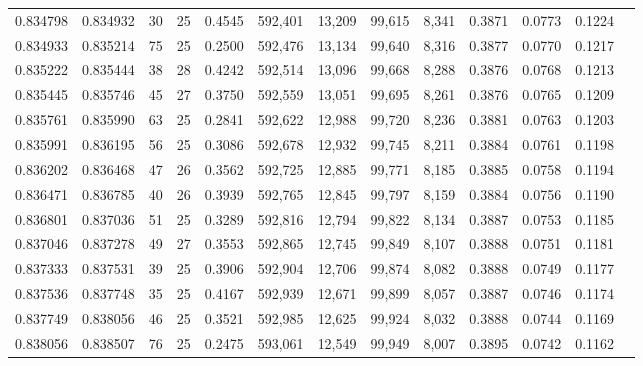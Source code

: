 \begin{tabular}{rrrrrrrrrrrrr}
0.834798 & 0.834932 &    30 &  25 &                                     0.4545 & 592,401 &  13,209 &  99,615 &   8,341 & 0.3871 & 0.0773 & 0.1224 \\
0.834933 & 0.835214 &    75 &  25 &                                     0.2500 & 592,476 &  13,134 &  99,640 &   8,316 & 0.3877 & 0.0770 & 0.1217 \\
0.835222 & 0.835444 &    38 &  28 &                                     0.4242 & 592,514 &  13,096 &  99,668 &   8,288 & 0.3876 & 0.0768 & 0.1213 \\
0.835445 & 0.835746 &    45 &  27 &                                     0.3750 & 592,559 &  13,051 &  99,695 &   8,261 & 0.3876 & 0.0765 & 0.1209 \\
0.835761 & 0.835990 &    63 &  25 &                                     0.2841 & 592,622 &  12,988 &  99,720 &   8,236 & 0.3881 & 0.0763 & 0.1203 \\
0.835991 & 0.836195 &    56 &  25 &                                     0.3086 & 592,678 &  12,932 &  99,745 &   8,211 & 0.3884 & 0.0761 & 0.1198 \\
0.836202 & 0.836468 &    47 &  26 &                                     0.3562 & 592,725 &  12,885 &  99,771 &   8,185 & 0.3885 & 0.0758 & 0.1194 \\
0.836471 & 0.836785 &    40 &  26 &                                     0.3939 & 592,765 &  12,845 &  99,797 &   8,159 & 0.3884 & 0.0756 & 0.1190 \\
0.836801 & 0.837036 &    51 &  25 &                                     0.3289 & 592,816 &  12,794 &  99,822 &   8,134 & 0.3887 & 0.0753 & 0.1185 \\
0.837046 & 0.837278 &    49 &  27 &                                     0.3553 & 592,865 &  12,745 &  99,849 &   8,107 & 0.3888 & 0.0751 & 0.1181 \\
0.837333 & 0.837531 &    39 &  25 &                                     0.3906 & 592,904 &  12,706 &  99,874 &   8,082 & 0.3888 & 0.0749 & 0.1177 \\
0.837536 & 0.837748 &    35 &  25 &                                     0.4167 & 592,939 &  12,671 &  99,899 &   8,057 & 0.3887 & 0.0746 & 0.1174 \\
0.837749 & 0.838056 &    46 &  25 &                                     0.3521 & 592,985 &  12,625 &  99,924 &   8,032 & 0.3888 & 0.0744 & 0.1169 \\
0.838056 & 0.838507 &    76 &  25 &                                     0.2475 & 593,061 &  12,549 &  99,949 &   8,007 & 0.3895 & 0.0742 & 0.1162 \\

\end{tabular}
